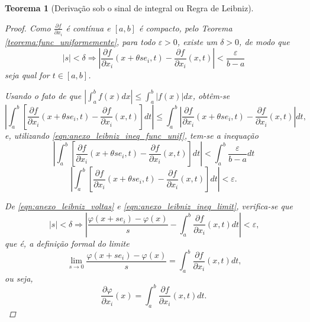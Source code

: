 \documentclass[
	12pt,				%
	openright,			%
    twoside,			%
	a4paper,			%
	english,			%
	french,				%
	spanish,			%
	brazil				%
	]{abntex2}
\newtheorem{teorema}{Teorema}
\numberwithin{lema}{chapter}
\numberwithin{teorema}{chapter}
\numberwithin{definicao}{chapter}
\numberwithin{figure}{chapter}
\begin{document}
\begin{apendicesenv}
{\begin{teorema}[Derivação sob o sinal de integral ou Regra de Leibniz]
\begin{proof}
			Como $\frac{\partial f}{\partial x_i}$ é contínua e $[a,b]$ é compacto, pelo Teorema \ref{teorema:func_uniformemente}, para todo $\varepsilon > 0$, existe um $\delta > 0$, de modo que
			\begin{equation}
				\label{eqn:anexo_leibniz_ineq_func_unif}
				|s|<\delta \Longrightarrow
				\left | 
					\frac{\partial f}{\partial x_i} (x+\theta s e_i, t) - \frac{\partial f}{\partial x_i}(x,t)
				\right | < \frac{\varepsilon}{b-a}
			\end{equation}
			seja qual for $t \in [a,b]$.
			
			Usando o fato de que $|\int_a^b f(x)dx| \leqslant \int_a^b |f(x)| dx$, obtêm-se
			$$
			\left |
				\int_a^b \left [
					\frac{\partial f}{\partial x_i}(x+\theta s e_i, t)-\frac{\partial f}{\partial x_i}(x,t)
				\right ] dt
			\right |
			\leqslant
			\int_a^b\left |
				\frac{\partial f}{\partial x_i}(x+\theta s e_i, t)-\frac{\partial f}{\partial x_i}(x,t)
			\right | dt\text{,}
			$$
			e, utilizando \eqref{eqn:anexo_leibniz_ineq_func_unif}, tem-se a inequação
			$$
			\left |
				\int_a^b \left [
					\frac{\partial f}{\partial x_i}(x+\theta s e_i, t)-\frac{\partial f}{\partial x_i}(x,t)
				\right ] dt
			\right |
			<
			\int_a^b \frac{\varepsilon}{b-a} dt
			$$
			\begin{equation}
				\label{eqn:anexo_leibniz_ineq_limit}
				\left |
					\int_a^b \left [
						\frac{\partial f}{\partial x_i}(x+\theta s e_i, t)-\frac{\partial f}{\partial x_i}(x,t)
					\right ] dt
				\right |
				< \varepsilon \text{.}
			\end{equation}
			
			De \eqref{eqn:anexo_leibniz_voltas} e \eqref{eqn:anexo_leibniz_ineq_limit}, verifica-se que
			$$
				|s|<\delta \Longrightarrow
				\left |
					\frac{\varphi(x+se_i)-\varphi(x)}{s}
					- \int_a^b \frac{\partial f}{\partial x_i}(x,t) dt
				\right |
				< \varepsilon\text{,}
			$$
			que é, a definição formal do limite
			$$
				 \lim_{s\to 0} \frac{\varphi (x+se_i)-\varphi(x)}{s}= \int_a^b \frac{\partial f}{\partial x_i} (x, t)dt \text{,}
			$$
			ou seja,
			$$
				\frac{\partial \varphi}{\partial x_i}(x)=\int _a^b \frac{\partial f}{\partial x_i}(x,t)dt\text{.}
			$$
		\end{proof}
	\end{teorema}
	

}

\end{apendicesenv}
\end{document}
